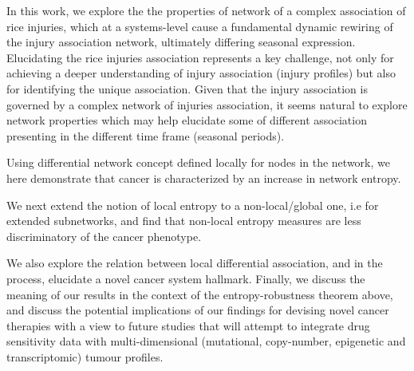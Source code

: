 In this work, we explore the the properties of network of a complex association of rice injuries, which at a systems-level cause a fundamental dynamic rewiring of the injury association network, ultimately differing seasonal expression. Elucidating the rice injuries association represents a key challenge, not only for achieving a deeper understanding of injury association (injury profiles) but also for identifying the unique association. Given that the injury association is governed by a complex network of injuries association, it seems natural to explore network properties which may help elucidate some of different association presenting in the different time frame (seasonal periods).


Using differential network concept defined locally for nodes in the network, we here demonstrate that cancer is characterized by an increase in network entropy. 

We next extend the notion of local entropy to a non-local/global one, i.e for extended subnetworks, and find that non-local entropy measures are less discriminatory of the cancer phenotype. 

We also explore the relation between local differential association, and in the process, elucidate a novel cancer system hallmark. Finally, we discuss the meaning of our results in the context of the entropy-robustness theorem above, and discuss the potential implications of our findings for devising novel cancer therapies with a view to future studies that will attempt to integrate drug sensitivity data with multi-dimensional (mutational, copy-number, epigenetic and transcriptomic) tumour profiles.